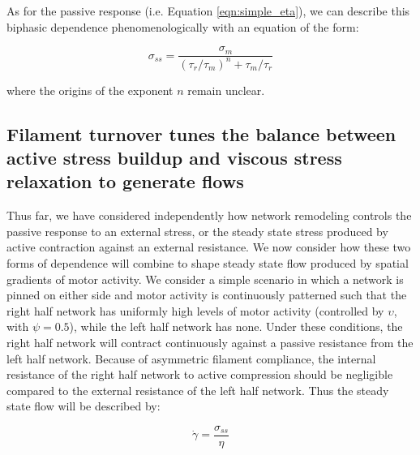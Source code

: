 \documentclass[10pt,letterpaper]{article}
\begin{document}
As for the passive response (i.e. Equation \ref{eqn:simple_eta}), we can describe this biphasic dependence phenomenologically with an equation of the form:

\begin{equation}
\label{eqn:simple_sigma}
\sigma_{ss} = \frac{\sigma_m}{(\tau_r/\tau_m)^n+\tau_m/\tau_r}  
\end{equation}

where the origins of the exponent $n$ remain unclear.




\subsection*{Filament turnover tunes the balance between active stress buildup and viscous stress relaxation to generate flows}

Thus far, we have considered independently how network remodeling controls the passive response to an external stress, or the steady state stress produced by active contraction against an external resistance. We now consider how these two forms of dependence will combine to shape steady state flow produced by spatial gradients of motor activity. We consider a simple scenario in which a network is pinned on either side and motor activity is continuously patterned such that the right half network has uniformly high levels of motor activity (controlled by $\upsilon$, with $\psi = 0.5$), while the left half network has none. Under these conditions, the right half network will contract continuously against a passive resistance from the left half network.  Because of asymmetric filament compliance, the internal resistance of the right half network to active compression should be negligible compared to the external resistance of the left half network.  Thus the steady state flow will be described by:

\begin{equation}
\label{eqn:everybody_knows}
\dot{\gamma} = \frac{\sigma_{ss}}{\eta}  
\end{equation}
\end{document}
